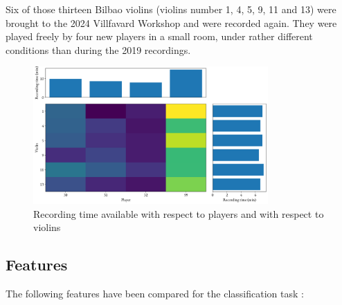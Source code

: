 \documentclass[letterpaper,11pt,leqno]{article}
\begin{document}
Six of those thirteen Bilbao violins (violins number 1, 4, 5, 9, 11 and 13) were brought to the 2024 Villfavard Workshop and were recorded again. They were played freely by four new players in a small room, under rather different conditions than during the 2019 recordings.

\begin{figure}[h]
	\includegraphics[width=0.8\textwidth]{../figures/class_weights_2024.png}
	\caption{Recording time available with respect to players and with respect to violins}
\end{figure}

\subsection{Features}

The following features have been compared for the classification task :
\end{document}
